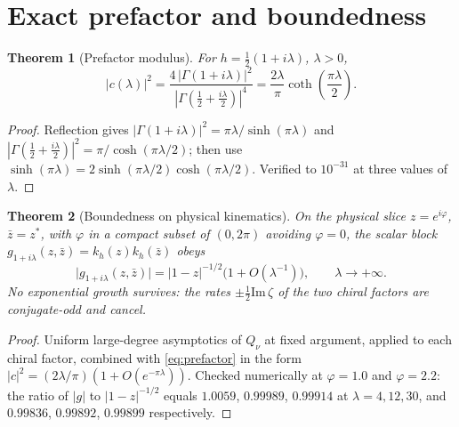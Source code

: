 \documentclass[12pt,a4paper]{article}
\theoremstyle{plain}
\newtheorem{theorem}{Theorem}[section]
\theoremstyle{definition}
\theoremstyle{remark}
\begin{document}
\section{Exact prefactor and boundedness}

\begin{theorem}[Prefactor modulus]
\label{thm:prefactor}
For $h=\tfrac12(1+i\lambda)$, $\lambda>0$,
\begin{equation}
|c(\lambda)|^2
=\frac{4\,|\Gamma(1+i\lambda)|^2}{|\Gamma(\tfrac12+\tfrac{i\lambda}{2})|^4}
=\frac{2\lambda}{\pi}\coth\!\left(\frac{\pi\lambda}{2}\right).
\label{eq:prefactor}
\end{equation}
\end{theorem}

\begin{proof}
Reflection gives $|\Gamma(1+i\lambda)|^2=\pi\lambda/\sinh(\pi\lambda)$
and $|\Gamma(\tfrac12+\tfrac{i\lambda}{2})|^2=\pi/\cosh(\pi\lambda/2)$;
then use $\sinh(\pi\lambda)=2\sinh(\pi\lambda/2)\cosh(\pi\lambda/2)$.
Verified to $10^{-31}$ at three values of $\lambda$.
\end{proof}

\begin{theorem}[Boundedness on physical kinematics]
\label{thm:tempered}
On the physical slice $z=e^{i\varphi}$, $\bar z=z^*$, with $\varphi$ in
a compact subset of $(0,2\pi)$ avoiding $\varphi=0$, the scalar block
$g_{1+i\lambda}(z,\bar z)=k_h(z)k_h(\bar z)$ obeys
\begin{equation}
\bigl|g_{1+i\lambda}(z,\bar z)\bigr|
=|1-z|^{-1/2}\bigl(1+O(\lambda^{-1})\bigr),
\qquad \lambda\to+\infty .
\label{eq:tempered}
\end{equation}
No exponential growth survives: the rates $\pm\tfrac12\mathrm{Im}\,\zeta$
of the two chiral factors are conjugate-odd and cancel.
\end{theorem}

\begin{proof}
Uniform large-degree asymptotics of $Q_\nu$ at fixed argument, applied
to each chiral factor, combined with \eqref{eq:prefactor} in the form
$|c|^2=(2\lambda/\pi)(1+O(e^{-\pi\lambda}))$. Checked numerically at
$\varphi=1.0$ and $\varphi=2.2$: the ratio of $|g|$ to $|1-z|^{-1/2}$
equals $1.0059$, $0.99989$, $0.99914$ at $\lambda=4,12,30$, and
$0.99836$, $0.99892$, $0.99899$ respectively.
\end{proof}
\end{document}
